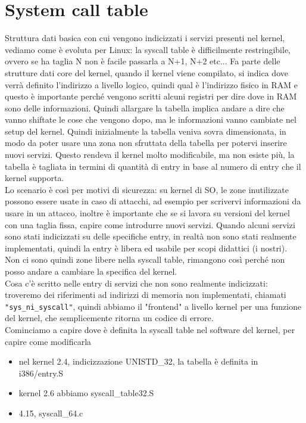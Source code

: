 \documentclass[12pt, oneside]{extbook}
\begin{document}
\section{System call table}
Struttura dati basica con cui vengono indicizzati i servizi presenti nel kernel, vediamo come è evoluta per Linux: la syscall table è difficilmente restringibile, ovvero se ha taglia N non è facile passarla a N+1, N+2 etc... Fa parte delle strutture dati core del kernel, quando il kernel viene compilato, si indica dove verrà definito l'indirizzo a livello logico, quindi qual è l'indirizzo fisico in RAM e questo è importante perché vengono scritti alcuni registri per dire dove in RAM sono delle informazioni. Quindi allargare la tabella implica andare a dire che vanno shiftate le cose che vengono dopo, ma le informazioni vanno cambiate nel setup del kernel. Quindi inizialmente la tabella veniva sovra dimensionata, in modo da poter usare una zona non sfruttata della tabella per potervi inserire nuovi servizi. Questo rendeva il kernel molto modificabile, ma non esiste più, la tabella è tagliata in termini di quantità di entry in base al numero di entry che il kernel supporta.\\ Lo scenario è così per motivi di sicurezza: su kernel di SO, le zone inutilizzate possono essere usate in caso di attacchi, ad esempio per scrivervi informazioni da usare in un attacco, inoltre è importante che se si lavora su versioni del kernel con una taglia fissa, capire come introdurre nuovi servizi. Quando alcuni servizi sono stati indicizzati su delle specifiche entry, in realtà non sono stati realmente implementati, quindi la entry è libera ed usabile per scopi didattici (i nostri).\\ Non ci sono quindi zone libere nella syscall table, rimangono così perché non posso andare a cambiare la specifica del kernel.\\ Cosa c'è scritto nelle entry di servizi che non sono realmente indicizzati: troveremo dei riferimenti ad indirizzi di memoria non implementati, chiamati \texttt{"sys\_ni\_syscall"}, quindi abbiamo il "frontend" a livello kernel per una funzione del kernel, che semplicemente ritorna un codice di errore.\\ Cominciamo a capire dove è definita la syscall table nel software del kernel, per capire come modificarla
\begin{itemize}
\item nel kernel 2.4, indicizzazione UNISTD\_32, la tabella è definita in i386/entry.S
\item kernel 2.6 abbiamo syscall\_table32.S
\item 4.15, syscall\_64.c
\end{itemize}
\end{document}
